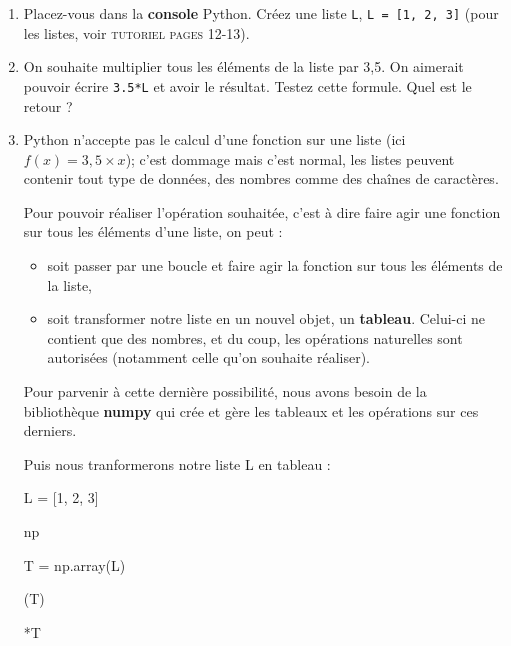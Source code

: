\documentclass[11pt]{article}
\begin{document}
\begin{enumerate}
 \item Placez-vous dans la \textbf{console} Python. Créez une liste \texttt{L}, \texttt{L = [1, 2, 3]} (pour les listes, voir \textsc{tutoriel pages 12-13}).
 
 
 \item On souhaite multiplier tous les éléments de la liste par 3,5. On aimerait pouvoir écrire \texttt{3.5*L} et avoir le résultat. Testez cette formule. Quel est le retour ?
 
 \item Python n'accepte pas le calcul d'une fonction sur une liste (ici $f(x) = 3,5\times x$); c'est dommage mais c'est normal, les listes peuvent contenir tout type de données, des nombres comme des chaînes de caractères.
 
 \smallskip
 Pour pouvoir réaliser l'opération souhaitée, c'est à dire faire agir une fonction sur tous les éléments d'une liste, on peut : 
 
 \begin{itemize}
 
\item  soit passer par une boucle et faire agir la fonction sur tous les éléments de la liste, 

\item soit transformer notre liste en un nouvel objet, un \textbf{tableau}. Celui-ci ne contient que des nombres, et du coup, les opérations naturelles sont autorisées (notamment celle qu'on souhaite réaliser).
 
 \end{itemize}
 
 \smallskip
  Pour parvenir à cette dernière possibilité, nous avons besoin de la bibliothèque \textbf{numpy} qui crée et gère les tableaux et les opérations sur ces derniers.

   Puis nous tranformerons notre liste L en tableau : 
   
   
   \begin{python}{0.8}

   \chev L = [1, 2, 3]
   
    \chev  \as np 
    
    \chev T = np.array(L) 
    
    \chev \print(T)
    
    *T
    

\end{python}
\end{enumerate}
\end{document}
